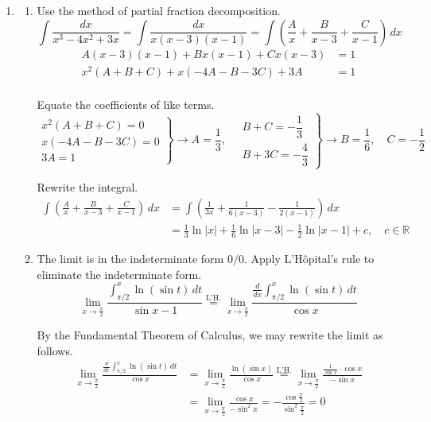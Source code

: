 \documentclass[a4paper, 12pt]{article}
\renewcommand{\headrulewidth}{0pt}
\begin{document}
\newpage
\pagestyle{fancy}
\renewcommand{\headrulewidth}{1pt}


\begin{enumerate}[leftmargin=*,label=\textbf{\arabic*.}]

\item \begin{enumerate}[leftmargin=*,label=\textbf{\alph*.}]
\item Use the method of partial fraction decomposition.
\[\int\frac{dx}{x^3-4x^2+3x}=\int\frac{dx}{x(x-3)(x-1)}=\int\left(\frac Ax+\frac B{x-3}+\frac C{x-1}\right)\,dx\]
\[\begin{array}{rc}A(x-3)(x-1)+Bx(x-1)+Cx(x-3)&=1\\x^2(A+B+C)+x(-4A-B-3C)+3A&=1\\&\end{array}\]

Equate the coefficients of like terms.
\[\left.\begin{array}{r}
x^2(A+B+C)=0\\
x(-4A-B-3C)=0\\
3A=1
\end{array}\right\}\rightarrow A=\frac13,\quad\left.\begin{array}{r}
B+C=-\dfrac13\\[1em]
B+3C=-\dfrac43
\end{array}\right\}\rightarrow B=\frac16,\quad C=-\frac12\]

Rewrite the integral.
\begin{align*}
\int\left(\frac Ax+\frac B{x-3}+\frac C{x-1}\right)\,dx&=\int\left(\frac1{3x}+\frac1{6(x-3)}-\frac1{2(x-1)}\right)\,dx\\[1em]&=\boxed{\frac13\ln|x|+\frac16\ln|x-3|-\frac12\ln|x-1|+c,\quad c\in\mathbb{R}}
\end{align*}

\item The limit is in the indeterminate form $0/0$. Apply L'Hôpital's rule to eliminate the indeterminate form.
\[\lim_{x\to\textstyle\frac\pi2}\frac{\displaystyle\int_{\pi/2}^x\ln(\sin t)\,dt}{\sin x-1}\overset{\text{L'H.}}{=}\lim_{x\to\textstyle\frac\pi2}\frac{\displaystyle\frac d{dx}\int_{\pi/2}^x\ln(\sin t)\,dt}{\cos x}\]

By the Fundamental Theorem of Calculus, we may rewrite the limit as follows.
\begin{align*}\lim_{x\to\textstyle\frac\pi2}\frac{\displaystyle\frac d{dx}\int_{\pi/2}^x\ln(\sin t)\,dt}{\cos x}&=\lim_{x\to\textstyle\frac\pi2}\frac{\ln(\sin x)}{\cos x}\overset{\text{L'H.}}{=}\lim_{x\to\textstyle\frac\pi2}\frac{\frac1{\sin x}\cdot\cos x}{-\sin x}\\[1em]&=\lim_{x\to\textstyle\frac\pi2}\frac{\cos x}{-\sin^2x}=-\frac{\cos\frac\pi2}{\sin^2\frac\pi2}=\boxed0\end{align*}


\end{enumerate}
\end{enumerate}
\end{document}
